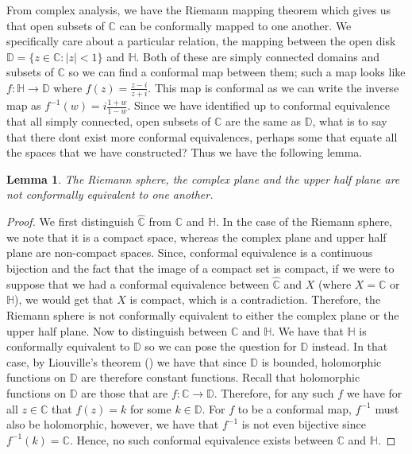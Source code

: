 \documentclass[11pt]{report}
\newtheorem{lemma}[thm]{Lemma}
\theoremstyle{definition}
\begin{document}
From complex analysis, we have the Riemann mapping theorem \cite[p.221]{ahlfors} which gives us that open subsets of $\mathbb{C}$ can be conformally mapped to one another. We specifically care about a particular relation, the mapping between the open disk $\mathbb{D}=\{z \in \mathbb{C} \colon |z| < 1\}$  and $\mathbb{H}$. Both of these are simply connected domains and subsets of $\mathbb{C}$ so we can find a conformal map between them; such a map looks like $f:\mathbb{H} \rightarrow \mathbb{D}$ where $f(z) = \frac{z-i}{z+i}$. This map is conformal as we can write the inverse map as $f^{-1}(w) = i\frac{1+w}{1-w}$.
Since we have identified up to conformal equivalence that all simply connected, open subsets of $\mathbb{C}$ are the same as $\mathbb{D}$, what is to say that there dont exist more conformal equivalences, perhaps some that equate all the spaces that we have constructed? Thus we have the following lemma.
\begin{lemma}
  The Riemann sphere, the complex plane and the upper half plane are not conformally equivalent to one another.
\end{lemma}
\begin{proof}
  We first distinguish $\hat{\mathbb{C}}$ from $\mathbb{C}$ and $\mathbb{H}$. In the case of the Riemann sphere, we note that it is a compact space, whereas the complex plane and upper half plane are non-compact spaces. Since, conformal equivalence is a continuous bijection and the fact that the image of a compact set is compact, if we were to suppose that we had a conformal equivalence between $\hat{\mathbb{C}}$ and $X$ (where $X = \mathbb{C}$ or $\mathbb{H}$), we would get that $X$ is compact, which is a contradiction. Therefore, the Riemann sphere is not conformally equivalent to either the complex plane or the upper half plane. 
  Now to distinguish between $\mathbb{C}$ and $\mathbb{H}$. We have that $\mathbb{H}$ is conformally equivalent to $\mathbb{D}$ so we can pose the question for $\mathbb{D}$ instead. In that case, by Liouville's theorem (\cite[p.122]{ahlfors}) we have that since $\mathbb{D}$ is bounded, holomorphic functions on $\mathbb{D}$ are therefore constant functions. Recall that holomorphic functions on $\mathbb{D}$ are those that are $f\colon \mathbb{C} \rightarrow \mathbb{D}$. Therefore, for any such $f$ we have for all $z \in \mathbb{C}$ that $f(z) = k$ for some $k \in \mathbb{D}$. For $f$ to be a conformal map, $f^{-1}$ must also be holomorphic, however, we have that $f^{-1}$ is not even bijective since $f^{-1}(k) = \mathbb{C}$. Hence, no such conformal equivalence exists between $\mathbb{C}$ and $\mathbb{H}$. 
\end{proof}
\end{document}
